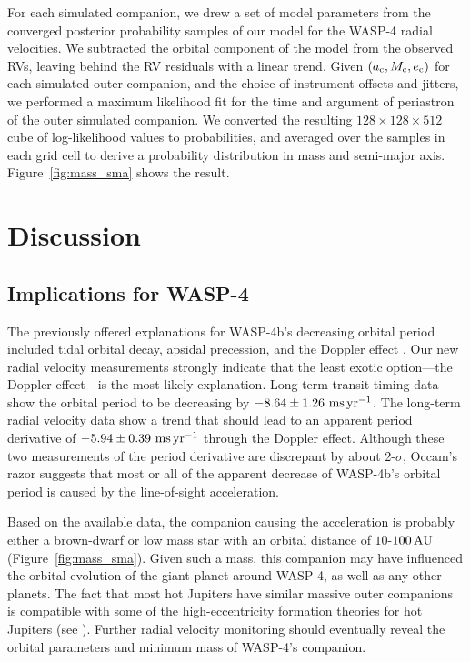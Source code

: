 \documentclass[12pt,twocolumn,tighten]{aastex62}
\begin{document}
For each simulated companion, we drew a set of model parameters from the converged
posterior probability samples of our model for the WASP-4 radial velocities.
We subtracted the orbital component of the model from the observed RVs,
leaving behind the RV residuals with a linear trend.  Given
$(a_{\rm c}, M_{\rm c}, e_{\rm c})$ for each simulated outer
companion, and the choice of instrument offsets and jitters,
we performed a maximum likelihood fit for the time and
argument of periastron of the outer simulated companion.  We converted
the resulting $128\times128\times512$ cube of log-likelihood values to
probabilities, and averaged over the samples in each grid cell to
derive a probability distribution in mass and semi-major axis.
Figure~\ref{fig:mass_sma} shows the result.

\section{Discussion}
\label{sec:discussion}

\subsection{Implications for WASP-4}

The previously offered explanations for WASP-4b's decreasing orbital
period included tidal orbital decay, apsidal precession, and
the Doppler effect \citep{bouma_wasp4b_2019}.  Our new radial
velocity measurements strongly indicate that the least exotic
option---the Doppler effect---is the most likely explanation.
Long-term transit timing data show the orbital period to be decreasing by $- 8.64 \pm 1.26~{\rm
ms}\,{\rm yr}^{-1}$.  The long-term radial velocity data show a trend that
should lead to an apparent period derivative of $-5.94 \pm 0.39~{\rm
ms}\,{\rm yr}^{-1}$ through the Doppler effect.
Although these two measurements of the period derivative are
discrepant by about 2-$\sigma$,
Occam's razor suggests that most or all of the apparent
decrease of WASP-4b's orbital period is caused by the line-of-sight
acceleration.

Based on the available data, the companion causing the
acceleration is probably either a brown-dwarf or low mass
star with an orbital distance of $10$-$100\,{\rm AU}$ 
(Figure~\ref{fig:mass_sma}).  Given such a mass, this companion may
have influenced the orbital evolution of the giant planet around WASP-4,
as well as any other planets.
The fact that most hot Jupiters have similar massive outer companions
\citep{knutson_friends_2014,bryan_statistics_2016} is compatible
with some of the high-eccentricity formation theories for hot Jupiters (see
\citealt{dawson_johnson_2018}).  Further radial velocity monitoring
should eventually reveal the orbital parameters and minimum mass of
WASP-4's companion.
\end{document}
